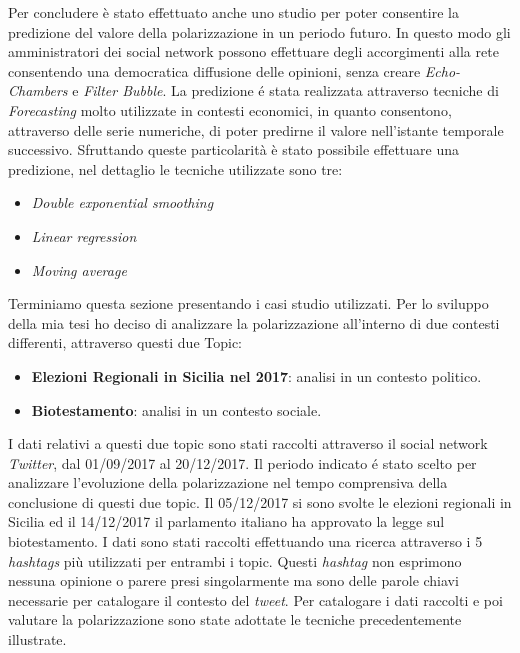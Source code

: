 Per concludere è stato effettuato anche uno studio per poter consentire la predizione del valore della polarizzazione in un periodo futuro. In questo modo gli amministratori dei social network possono effettuare degli accorgimenti alla rete consentendo una democratica diffusione delle opinioni, senza creare \textit{Echo-Chambers} e \textit{Filter Bubble}.  
La predizione \'e stata realizzata attraverso tecniche di \textit{Forecasting} molto utilizzate in contesti economici, in quanto consentono, attraverso delle serie numeriche, di poter predirne il valore nell'istante temporale successivo. Sfruttando queste particolarità è stato possibile effettuare una predizione, nel dettaglio le tecniche utilizzate sono tre:
\begin{itemize}
\item \textit{Double exponential smoothing}
\item \textit{Linear regression}
\item \textit{Moving average}
\end{itemize}


Terminiamo questa sezione presentando i casi studio utilizzati. Per lo sviluppo della mia tesi ho deciso di analizzare  la polarizzazione all'interno di due contesti differenti, attraverso questi due Topic:
\begin{itemize}
\item \textbf{Elezioni Regionali in Sicilia nel 2017}: analisi in un contesto politico.
\item \textbf{Biotestamento}: analisi in un contesto sociale.
\end{itemize}
I dati relativi a questi due topic sono stati raccolti attraverso il social network \textit{Twitter}, dal 01/09/2017 al 20/12/2017. Il periodo indicato \'e stato scelto per analizzare l'evoluzione della polarizzazione nel tempo comprensiva della conclusione di questi due topic.
Il 05/12/2017 si sono svolte le elezioni regionali in Sicilia ed il 14/12/2017 il parlamento italiano ha approvato la legge sul biotestamento.
I dati sono stati raccolti effettuando una ricerca attraverso i 5 \textit{hashtags} più utilizzati per entrambi i topic. Questi \textit{hashtag} non esprimono nessuna opinione o parere presi singolarmente ma sono delle parole chiavi necessarie per catalogare il contesto del \textit{tweet}. Per catalogare i dati raccolti e poi valutare la polarizzazione sono state adottate le tecniche precedentemente illustrate.

